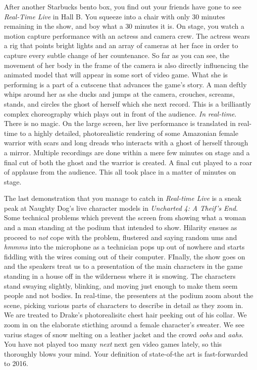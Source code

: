 \documentclass[../main.tex]{subfiles}
\begin{document}
After another Starbucks bento box, you find out your friends have gone to see \textit{Real-Time Live} in Hall B. You squeeze into a chair with only 30 minutes remaining in the show, and boy what a 30 minutes it is. On stage, you watch a motion capture performance with an actress and camera crew. The actress wears a rig that points bright lights and an array of cameras at her face in order to capture every subtle change of her countenance.  So far as you can see, the movement of her body in the frame of the camera is also directly influencing the animated model that will appear in some sort of video game. What she is performing is a part of a cutscene that advances the game's story. A man deftly whips around her as she ducks and jumps at the camera, crouches, screams, stands, and circles the ghost of herself which she next record. This is a brilliantly complex choreography which plays out in front of the audience. \textit{In real-time}. There is no magic. On the large screen, her live performance is translated in real-time to a highly detailed, photorealistic rendering of some Amazonian female warrior with scars and long dreads who interacts with a ghost of herself through a mirror. Multiple recordings are done within a mere few minutes on stage and a final cut of both the ghost and the warrior is created. A final cut played to a roar of applause from the audience. This all took place in a matter of minutes on stage.

The last demonstration that you manage to catch in \textit{Real-time Live} is a sneak peak at Naughty Dog's live character models in \textit{Uncharted 4: A Theif's End}. Some technical problems which prevent the screen from showing what a woman and a man standing at the podium that intended to show. Hilarity ensues as proceed to \textit{not} cope with the problem, flustered and saying random ums and \textit{hmmms} into the microphone as a technician pops up out of nowhere and starts fiddling with the wires coming out of their computer. FInally, the show goes on and the speakers treat us to a presentation of the main characters in the game standing in a house off in the wilderness where it is snowing. The characters stand swaying slightly, blinking, and moving just enough to make them seem people and not bodies. In real-time, the presenters at the podium zoom about the scene, picking various parts of characters to describe in detail as they zoom in. We are treated to Drake's photorealisitc chest hair peeking out of his collar. We zoom in on the elaborate sticthing around a female character's sweater. We see varius stages of snow melting on a leather jacket and the crowd \textit{oohs} and \textit{aahs}. You have not played too many \textit{next} next gen video games lately, so this thoroughly blows your mind. Your definition of state-of-the art is fast-forwarded to 2016.
\end{document}
